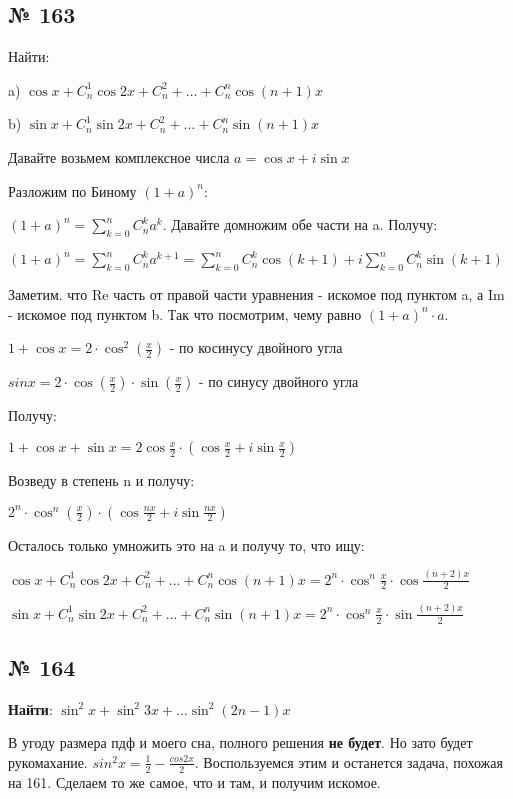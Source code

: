 \documentclass{article}
\begin{document}
\subsection{№ 163}

Найти:

a) $\cos x + C_n^1 \cos 2x + C_n^2 +\ldots + C_n^n \cos(n+1)x$

b) $\sin x + C_n^1 \sin 2x + C_n^2 +\ldots + C_n^n \sin(n+1)x$

Давайте возьмем комплексное числа $a = \cos x + i\sin x$

Разложим по Биному $(1+a)^n$:

$(1+a)^n = \sum\limits_{k=0}^n C_n^k a^k$. Давайте домножим обе части на a. Получу:

$(1+a)^n = \sum\limits_{k=0}^n C_n^k a^{k+1} = \sum\limits_{k=0}^n C_n^k \cos {(k+1)} + i\sum\limits_{k=0}^n C_n^k \sin {(k+1)}$

Заметим. что Re часть от правой части уравнения - искомое под пунктом a, а Im  - искомое под пунктом b. Так что посмотрим, чему равно $(1+a)^n \cdot a$.

$1+\cos x = 2 \cdot \cos^2(\frac{x}{2})$ - по косинусу двойного угла

$sin x = 2 \cdot \cos(\frac{x}{2}) \cdot \sin (\frac{x}{2}) $ - по синусу двойного угла

Получу:

$1+\cos x + \sin x = 2\cos \frac{x}{2} \cdot(\cos \frac{x}{2} + i\sin \frac{x}{2})$

Возведу в степень n и получу:

$2^n \cdot \cos^n(\frac{x}{2})\cdot(\cos \frac{nx}{2} + i \sin \frac{nx}{2})$

Осталось только умножить это на a и получу то, что ищу:


$\cos x + C_n^1 \cos 2x + C_n^2 +\ldots + C_n^n \cos(n+1)x = 2^n \cdot \cos^n\frac{x}{2} \cdot \cos \frac{(n+2)x}{2}$

$\sin x + C_n^1 \sin 2x + C_n^2 +\ldots + C_n^n \sin(n+1)x =2^n \cdot \cos^n\frac{x}{2} \cdot \sin \frac{(n+2)x}{2}$

\pagebreak
\subsection{№ 164}

\textbf{Найти}: $\sin^2 x + \sin^2 3x + \ldots \sin^2(2n-1)x$


В угоду размера пдф и моего сна, полного решения \textbf{не будет}. Но зато будет  рукомахание. 
$sin^2 x = \frac{1}{2}-\frac{cos 2x}{2}$. Воспользуемся этим и останется задача, похожая на 161. Сделаем то же самое, что и там, и получим искомое.
\end{document}
